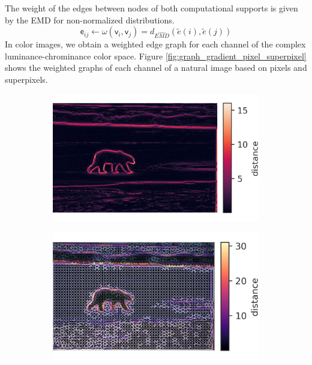\documentclass[journal]{IEEEtran}
\begin{document}
The weight of the edges between nodes of both computational supports is given by the EMD for non-normalized distributions. 
\begin{equation}
	\mathsf{e}_{ij} \leftarrow \omega(\mathsf{v}_i, \mathsf{v}_j) = d_{\widehat{EMD}}(\widetilde{e}(i), \widetilde{e}(j))
\end{equation}
In color images, we obtain a weighted edge graph for each channel of the complex luminance-chrominance color space. Figure \ref{fig:graph_gradient_pixel_superpixel} shows the weighted graphs of each channel of a natural image based on pixels and superpixels. 

\begin{figure}[!ht]
    \centering
    \begin{subfigure}[b]{0.24\textwidth}
    	\includegraphics[width=\textwidth]{100007_lum_grad} 
    \end{subfigure}         
    \begin{subfigure}[b]{0.24\textwidth}
        \includegraphics[width=\textwidth]{100007_weighted_lum_rag}

\end{subfigure}
\end{figure}
\end{document}
